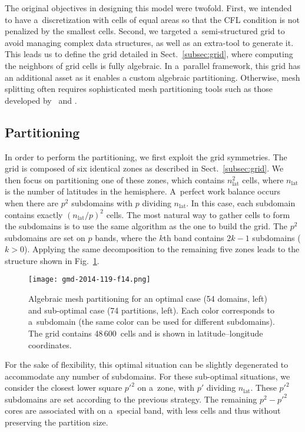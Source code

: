    The original objectives in designing this model were
   twofold. First, we intended to have a~discretization with cells of
   equal areas so that the CFL condition is not penalized by the
   smallest cells. Second, we targeted a~semi-structured grid to avoid
   managing complex data structures, as well as an extra-tool to
   generate it. This leads us to define the grid detailed in
   Sect.~\ref{subsec:grid}, where computing the neighbors of grid
   cells is fully algebraic. In a~parallel framework, this grid has an
   additional asset as it enables a custom algebraic
   partitioning. Otherwise, mesh splitting often requires
   sophisticated mesh partitioning tools such as those developed
   by~\citet{Karypis1995} and \citet{Pellegrini2012}.

   \subsection{Partitioning}

   In order to perform the partitioning, we first exploit the grid
   symmetries. The grid is composed of six identical zones as
   described in Sect.~\ref{subsec:grid}.  We then focus on
   partitioning one of these zones, which contains $n^2_\mathrm{lat}$ cells, where
   $n_\mathrm{lat}$ is the number of latitudes in the hemisphere. A~perfect work
   balance occurs when there are $p^2$ subdomains with $p$ dividing
   $n_\mathrm{lat}$. In this case, each subdomain contains exactly $(n_\mathrm{lat}/p)^2$ cells.
   The most natural way to gather cells to form the subdomains is to
   use the same algorithm as the one to build the grid. The $p^2$
   subdomains are set on $p$ bands, where the $k$th band contains
   $2k-1$ subdomains ($k>0$). Applying the same decomposition to the
   remaining five zones leads to the structure shown in
   Fig.~\ref{fig2:partitioning}.

\begin{figure}[t]
  \centering
\texttt{[image: gmd-2014-119-f14.png]}
  \caption{Algebraic mesh partitioning for an optimal case (54 domains, left) and
    sub-optimal case (74 partitions, left). Each color corresponds to a~subdomain (the
    same color can be used for different subdomains). The grid contains 48\,600~cells and is shown in latitude--longitude coordinates. }
  \label{fig2:partitioning}%
\end{figure}%





   For the sake of flexibility, this optimal situation can be slightly
   degenerated to accommodate any number of subdomains. For these
   sub-optimal situations, we consider the closest lower square $p'^2$
   on a~zone, with $p'$ dividing $n_\mathrm{lat}$.  These $p'^2$ subdomains are set
   according to the previous strategy. The remaining $p^2-p'^2$ cores
   are associated with on a~special band, with less cells and thus
   without preserving the partition size.

